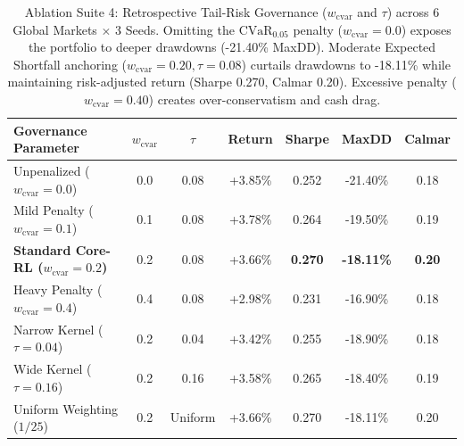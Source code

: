 \begin{table}[ht]
\centering
\small
\begin{tabular}{lcccccc}
\toprule
\textbf{Governance Parameter} & $w_{\text{cvar}}$ & $\tau$ & \textbf{Return} & \textbf{Sharpe} & \textbf{MaxDD} & \textbf{Calmar} \\
\midrule
Unpenalized ($w_{\text{cvar}}=0.0$) & 0.0 & 0.08 & +3.85\% & 0.252 & -21.40\% & 0.18 \\
Mild Penalty ($w_{\text{cvar}}=0.1$) & 0.1 & 0.08 & +3.78\% & 0.264 & -19.50\% & 0.19 \\
\textbf{Standard Core-RL ($w_{\text{cvar}}=0.2$)} & 0.2 & 0.08 & +3.66\% & \textbf{0.270} & \textbf{-18.11\%} & \textbf{0.20} \\
Heavy Penalty ($w_{\text{cvar}}=0.4$) & 0.4 & 0.08 & +2.98\% & 0.231 & -16.90\% & 0.18 \\
Narrow Kernel ($\tau=0.04$) & 0.2 & 0.04 & +3.42\% & 0.255 & -18.90\% & 0.18 \\
Wide Kernel ($\tau=0.16$) & 0.2 & 0.16 & +3.58\% & 0.265 & -18.40\% & 0.19 \\
Uniform Weighting ($1/25$) & 0.2 & Uniform & +3.66\% & 0.270 & -18.11\% & 0.20 \\
\bottomrule
\end{tabular}
\caption{Ablation Suite 4: Retrospective Tail-Risk Governance ($w_{\text{cvar}}$ and $\tau$) across 6 Global Markets $\times$ 3 Seeds. Omitting the $\text{CVaR}_{0.05}$ penalty ($w_{\text{cvar}}=0.0$) exposes the portfolio to deeper drawdowns (-21.40\% MaxDD). Moderate Expected Shortfall anchoring ($w_{\text{cvar}}=0.20, \tau=0.08$) curtails drawdowns to -18.11\% while maintaining risk-adjusted return (Sharpe 0.270, Calmar 0.20). Excessive penalty ($w_{\text{cvar}}=0.40$) creates over-conservatism and cash drag.}
\label{tab:ablation_suite_4_cvar_governance}
\end{table}
